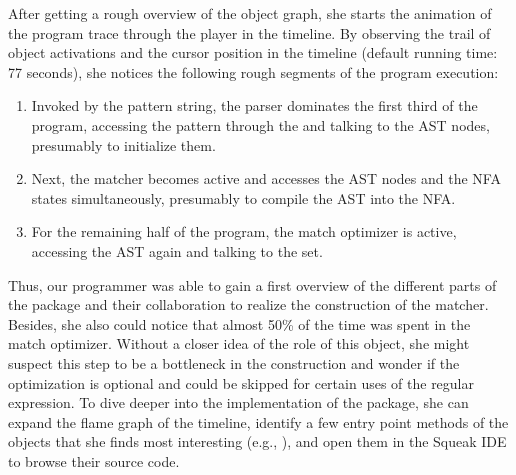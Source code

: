 After getting a rough overview of the object graph, she starts the animation of the program trace through the player in the timeline.
By observing the trail of object activations and the cursor position in the timeline (default running time: 77 seconds), she notices the following rough segments of the program execution:

\begin{enumerate}
	\item Invoked by the pattern string, the parser dominates the first third of the program, accessing the pattern through the  and talking to the AST nodes, presumably to initialize them.
	\item Next, the matcher becomes active and accesses the AST nodes and the NFA states simultaneously, presumably to compile the AST into the NFA.
	\item For the remaining half of the program, the match optimizer is active, accessing the AST again and talking to the set.
\end{enumerate}

Thus, our programmer was able to gain a first overview of the different parts of the  package and their collaboration to realize the construction of the matcher.
Besides, she also could notice that almost 50\si{\percent} of the time was spent in the match optimizer.
Without a closer idea of the role of this object, she might suspect this step to be a bottleneck in the construction and wonder if the optimization is optional and could be skipped for certain uses of the regular expression.
To dive deeper into the implementation of the  package, she can expand the flame graph of the timeline, identify a few entry point methods of the objects that she finds most interesting (e.g., ), and open them in the Squeak IDE to browse their source code.


